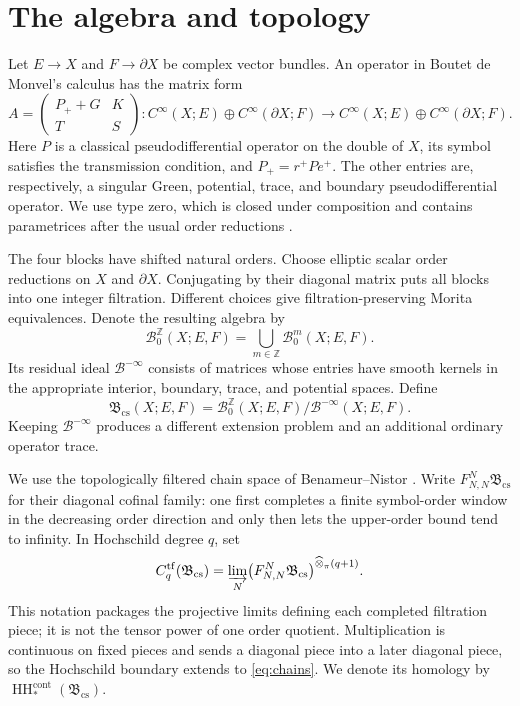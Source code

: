 \documentclass[11pt,oneside,reqno]{article}
\DeclareMathOperator{\HH}{HH}
\newcommand{\Z}{\mathbb Z}
\newcommand{\cB}{\mathcal B}
\newcommand{\Bcs}{\mathfrak B_{\mathrm{cs}}}
\theoremstyle{plain}
\theoremstyle{definition}
\theoremstyle{remark}
\begin{document}
\section{The algebra and topology}\label{sec:algebra}

Let \(E\to X\) and \(F\to\partial X\) be complex vector bundles. An operator
in Boutet de Monvel's calculus has the matrix form
\begin{equation}\label{eq:BdM-matrix}
 A=\begin{pmatrix}
       P_++G & K\\
       T     & S
    \end{pmatrix}:
 C^\infty(X;E)\oplus C^\infty(\partial X;F)
 \longrightarrow
 C^\infty(X;E)\oplus C^\infty(\partial X;F).
\end{equation}
Here \(P\) is a classical pseudodifferential operator on the double of
\(X\), its symbol satisfies the transmission condition, and
\(P_+=r^+Pe^+\). The other entries are, respectively, a singular Green,
potential, trace, and boundary pseudodifferential operator. We use type zero,
which is closed under composition and contains parametrices after the usual
order reductions \cite{Boutet,Grubb}.

The four blocks have shifted natural orders. Choose elliptic scalar order
reductions on \(X\) and \(\partial X\). Conjugating by their diagonal matrix
puts all blocks into one integer filtration. Different choices give
filtration-preserving Morita equivalences. Denote the resulting algebra by
\[
 \cB^{\mathbb Z}_0(X;E,F)=\bigcup_{m\in\Z}\cB^m_0(X;E,F).
\]
Its residual ideal \(\cB^{-\infty}\) consists of matrices whose entries have
smooth kernels in the appropriate interior, boundary, trace, and potential
spaces. Define
\begin{equation}\label{eq:Bcs}
 \Bcs(X;E,F)=
 \cB^{\mathbb Z}_0(X;E,F)/\cB^{-\infty}(X;E,F).
\end{equation}
Keeping \(\cB^{-\infty}\) produces a different extension problem and an
additional ordinary operator trace.

We use the topologically filtered chain space of Benameur--Nistor
\cite[Definition~1]{BenameurNistorFamilies}. Write
\(F^N_{N,N}\Bcs\) for their diagonal cofinal family: one first completes a
finite symbol-order window in the decreasing order direction and only then
lets the upper-order bound tend to infinity. In Hochschild degree \(q\), set
\begin{equation}\label{eq:chains}
 C_q^{\mathrm{tf}}(\Bcs)
 =\varinjlim_N
 \bigl(F^N_{N,N}\Bcs\bigr)^{\widehat\otimes_\pi(q+1)}.
\end{equation}
This notation packages the projective limits defining each completed
filtration piece; it is not the tensor power of one order quotient.
Multiplication is continuous on fixed pieces and sends a diagonal piece into
a later diagonal piece, so the Hochschild boundary extends to
\eqref{eq:chains}. We denote its homology by
\(\HH_*^{\mathrm{cont}}(\Bcs)\).
\end{document}
